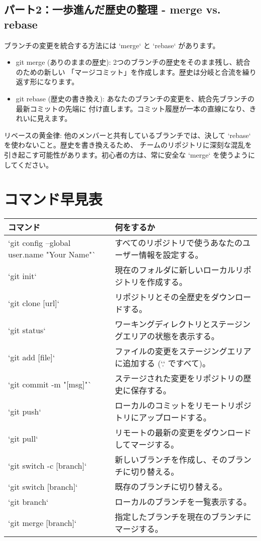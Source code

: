 \documentclass{ltjsarticle}
\begin{document}
\subsection{パート2：一歩進んだ歴史の整理 - merge vs. rebase}
ブランチの変更を統合する方法には `merge` と `rebase` があります。
\begin{itemize}
    \item git merge (ありのままの歴史): 2つのブランチの歴史をそのまま残し、統合のための新しい
		「マージコミット」を作成します。歴史は分岐と合流を繰り返す形になります。
    \item git rebase (歴史の書き換え): あなたのブランチの変更を、統合先ブランチの最新コミットの先端に
		付け直します。コミット履歴が一本の直線になり、きれいに見えます。
\end{itemize}
リベースの黄金律: 他のメンバーと共有しているブランチでは、決して `rebase` を使わないこと。歴史を書き換えるため、
チームのリポジトリに深刻な混乱を引き起こす可能性があります。初心者の方は、常に安全な `merge` を使うように
してください。

\appendix
\section{コマンド早見表}
\begin{tabularx}{\textwidth}{|l|X|}
\hline
コマンド & 何をするか \\ 
\hline
`git config --global user.name "Your Name"` & すべてのリポジトリで使うあなたのユーザー情報を設定する。 \\ 
`git init` & 現在のフォルダに新しいローカルリポジトリを作成する。 \\ 
`git clone [url]` & リポジトリとその全歴史をダウンロードする。 \\ 
`git status` & ワーキングディレクトリとステージングエリアの状態を表示する。 \\ 
`git add [file]` & ファイルの変更をステージングエリアに追加する (`.` ですべて)。 \\ 
`git commit -m "[msg]"` & ステージされた変更をリポジトリの歴史に保存する。 \\ 
`git push` & ローカルのコミットをリモートリポジトリにアップロードする。 \\ 
`git pull` & リモートの最新の変更をダウンロードしてマージする。 \\ 
`git switch -c [branch]` & 新しいブランチを作成し、そのブランチに切り替える。 \\ 
`git switch [branch]` & 既存のブランチに切り替える。 \\ 
`git branch` & ローカルのブランチを一覧表示する。 \\ 
`git merge [branch]` & 指定したブランチを現在のブランチにマージする。 \\ 
\hline
\end{tabularx}
\end{document}
